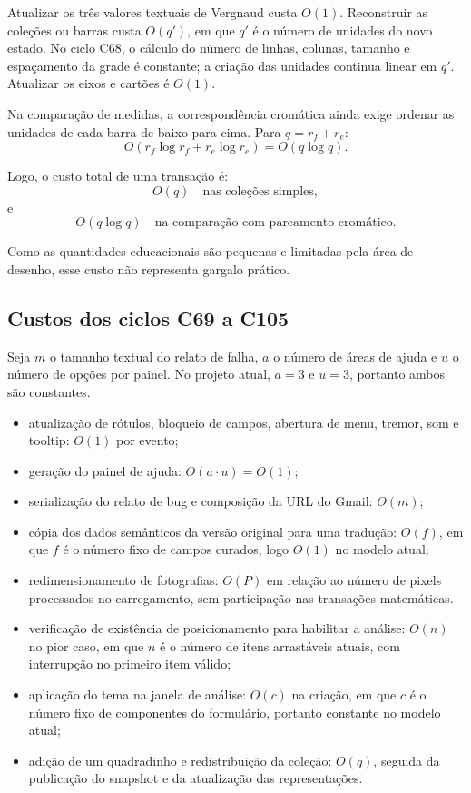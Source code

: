 \documentclass[12pt,a4paper]{article}
\begin{document}
Atualizar os três valores textuais de Vergnaud custa $O(1)$. Reconstruir as coleções ou barras custa $O(q')$, em que $q'$ é o número de unidades do novo estado. No ciclo C68, o cálculo do número de linhas, colunas, tamanho e espaçamento da grade é constante; a criação das unidades continua linear em $q'$. Atualizar os eixos e cartões é $O(1)$.

Na comparação de medidas, a correspondência cromática ainda exige ordenar as unidades de cada barra de baixo para cima. Para $q=r_f+r_e$:
\[
O(r_f\log r_f+r_e\log r_e)=O(q\log q).
\]

Logo, o custo total de uma transação é:
\[
O(q) \quad \text{nas coleções simples},
\]
e
\[
O(q\log q) \quad \text{na comparação com pareamento cromático}.
\]

Como as quantidades educacionais são pequenas e limitadas pela área de desenho, esse custo não representa gargalo prático.

\subsection{Custos dos ciclos C69 a C105}
Seja $m$ o tamanho textual do relato de falha, $a$ o número de áreas de ajuda e $u$ o número de opções por painel. No projeto atual, $a=3$ e $u=3$, portanto ambos são constantes.

\begin{itemize}[noitemsep]
  \item atualização de rótulos, bloqueio de campos, abertura de menu, tremor, som e tooltip: $O(1)$ por evento;
  \item geração do painel de ajuda: $O(a\cdot u)=O(1)$;
  \item serialização do relato de bug e composição da URL do Gmail: $O(m)$;
  \item cópia dos dados semânticos da versão original para uma tradução: $O(f)$, em que $f$ é o número fixo de campos curados, logo $O(1)$ no modelo atual;
  \item redimensionamento de fotografias: $O(P)$ em relação ao número de pixels processados no carregamento, sem participação nas transações matemáticas.
  \item verificação de existência de posicionamento para habilitar a análise: $O(n)$ no pior caso, em que $n$ é o número de itens arrastáveis atuais, com interrupção no primeiro item válido;
  \item aplicação do tema na janela de análise: $O(c)$ na criação, em que $c$ é o número fixo de componentes do formulário, portanto constante no modelo atual;
  \item adição de um quadradinho e redistribuição da coleção: $O(q)$, seguida da publicação do snapshot e da atualização das representações.
\end{itemize}
\end{document}

